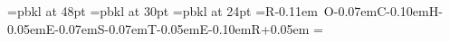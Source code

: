 %
%
%
\font\biglogofont=pbkl at 48pt
\font\medlogofont=pbkl at 30pt
\font\smalllogofont=pbkl at 24pt
%
\def\back{\kern-0.07em}
\def\backmore{\kern-0.10em}
\def\backless{\kern-0.05em}
\def\thin{\kern+0.12em}
\def\thinner{\kern+0.10em}
\def\tiny{\kern+0.05em}
\def\tinier{\kern+0.04em}
%
\def\UNIVERSITYOF{\medlogofont U\thinner N\thin I\thin V\thin E\thin R\thin S\thin I\thin T\thin Y O\thinner F}
\def\ROCHESTER{\biglogofont R\kern-0.11em O\back C\backmore H\backless E\back S\back T\backless E\backmore R\tiny}
\def\COMPUTERSCIENCE{\smalllogofont C\tinier O\tiny M\tiny P\tiny U\tiny T\tiny E\tiny R S\tinier C\tiny I\tiny E\tiny N\tiny C\tiny E}
%
\newbox\logo
\newdimen\logowidth
\setbox\logo=\hbox{\ROCHESTER}
\logowidth=\wd\logo
%
%
%
%
\def\urcslogo{\vbox{
	\hbox to\logowidth{\UNIVERSITYOF}
	\vskip 6pt
	\hrule
	\vskip 6pt
	\hbox{\ROCHESTER}
	\vskip 6pt
	\hrule
	\vskip 6pt
	\hbox to\logowidth{\COMPUTERSCIENCE}
	\vskip 6pt
	}
}
